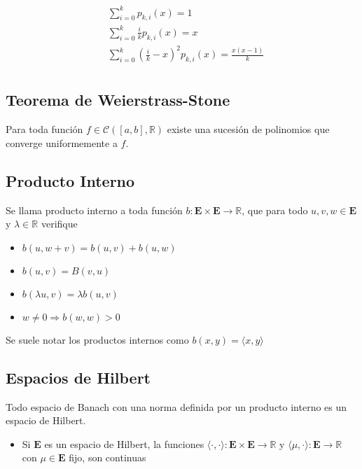 \begin{equation}
\begin{split}
    &\sum^k_{i=0}p_{k,i}(x)=1\\
    &\sum^k_{i=0}\frac{i}{k}p_{k,i}(x)=x\\
    &\sum^k_{i=0}(\frac{i}{k}-x)^2p_{k,i}(x)=\frac{x(x-1)}{k}\\
\end{split}
\nonumber
\end{equation}

\subsection{Teorema de Weierstrass-Stone}
\label{T:Weierstrass-Stone}
Para toda función $f\in\mathcal{C}([a,b],\mathbb{R})$ existe una sucesión de polinomios que converge uniformemente a $f$.

\subsection{Producto Interno}

Se llama producto interno a toda función $b:\mathbf{E}\times\mathbf{E}\to\mathbb{R}$, que para todo $u,v,w\in\mathbf{E}$ y $\lambda\in\mathbb{R}$ verifique

\begin{itemize}
    \item $b(u,w+v)=b(u,v)+b(u,w)$
    \item $b(u,v)=B(v,u)$
    \item $b(\lambda u,v)=\lambda b(u,v)$
    \item $w\neq 0\Rightarrow b(w,w)>0$
\end{itemize}

Se suele notar los productos internos como $b(x,y)=\langle x,y\rangle$

\subsection{Espacios de Hilbert}

Todo espacio de Banach con una norma definida por un producto interno es un espacio de Hilbert.

\begin{itemize}
    \item Si $\mathbf{E}$ es un espacio de Hilbert, la funciones $\langle\cdot,\cdot\rangle:\mathbf{E}\times\mathbf{E}\to\mathbb{R}$ y $\langle\mu,\cdot\rangle:\mathbf{E}\to\mathbb{R}$ con $\mu\in\mathbf{E}$ fijo, son continuas
\end{itemize}

